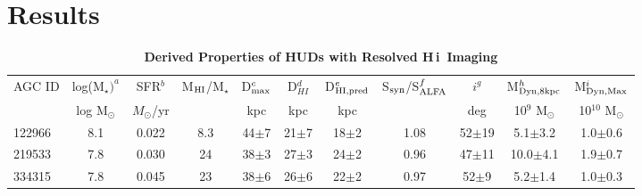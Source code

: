 \documentclass[twocolumn]{aastex6}
\newcommand{\msun}{M_{\odot}}
\def\msun{$M_\odot$}
\newcommand{\hi}{H{\sc\,i}}
\begin{document}
\section{Results}
\label{results}

\begin{table}[]%
\caption{\textbf{Derived Properties of HUDs with Resolved \hi\ Imaging}}
\vskip 5pt
\centering
\footnotesize{
\begin{tabular}{lcccccccccc}
\hline
\hline
AGC ID & log(M$_{\star})^a$ & SFR$^b$   & M$_{\rm HI}$/M$_{\star}$ &  D$_{\rm max}^c$ & D$_{HI}^d$ & D$_{\rm HI,pred}^e$ & S$_{\rm syn}$/S$_{\rm ALFA}^f$  & $i^g$ & M$_{\rm Dyn, 8kpc}^h$ & M$_{\rm Dyn, Max}^i$\\%
       &   log M$_{\odot}$ & \msun/yr &   & kpc  & kpc  & kpc &  & deg &  10$^9$ M$_{\odot}$ & 10$^{10}$ M$_{\odot}$ \\
\hline
  122966 & 8.1  & 0.022   & 8.3  & 44$\pm$7 & 21$\pm$7  & 18$\pm$2  & 1.08  & 52$\pm$19  & 5.1$\pm$3.2 & 1.0$\pm$0.6 \\
  219533 & 7.8  & 0.030   & 24  & 38$\pm$3  &  27$\pm$3 & 24$\pm$2  & 0.96  & 47$\pm$11   & 10.0$\pm$4.1 & 1.9$\pm$0.7 \\
  334315 & 7.8  & 0.045   & 23  & 38$\pm$6  &  26$\pm$6 & 22$\pm$2  &  0.97  & 52$\pm$9   & 5.2$\pm$1.4 & 1.0$\pm$0.3 \\
\hline
\hline
\end{tabular}\label{synthesistable}
}
\end{table}
\end{document}
